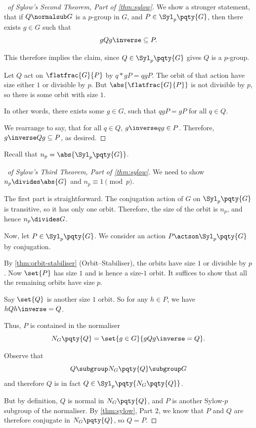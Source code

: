 \begin{proof}[\proofname\ of Sylow's Second Theorem, Part of \autoref{thm:sylow}]
    We show a stronger statement, that if \(Q \normalsub G\) is a \(p\)-group in \(G\), and \(P \in \Syl_p\pqty{G}\), then there exists \(g \in G\) such that
    \[
        g Q g\inverse \subseteq P.
    \]

    This therefore implies the claim, since \(Q \in \Syl_p\pqty{G}\) gives \(Q\) is a \(p\)-group.

    Let \(Q\) act on \(\flatfrac{G}{P}\) by \(q \ast gP = q gP\). The orbit of that action have size either \(1\) or divisible by \(p\). But \(\abs{\flatfrac{G}{P}}\) is not divisible by \(p\), so there is some orbit with size \(1\).

    In other words, there exists some \(g \in G\), such that \(qgP = gP\) for all \(q \in Q\).

    We rearrange to say, that for all \(q \in Q\), \(g \inverse q g \in P\). Therefore, \(g \inverse Q g \subseteq P\), as desired.
\end{proof}

Recall that \(n_p = \abs{\Syl_p\pqty{G}}\).

\begin{proof}[\proofname\ of Sylow's Third Theorem, Part of \autoref{thm:sylow}]
    We need to show \(n_p \divides \abs{G}\) and \(n_p \equiv 1 \pmod{p}\).

    The first part is straightforward. The conjugation action of \(G\) on \(\Syl_p\pqty{G}\) is transitive, so it has only one orbit. Therefore, the size of the orbit is \(n_p\), and hence \(n_p \divides G\).

    Now, let \(P \in \Syl_p\pqty{G}\). We consider an action \(P \actson \Syl_p\pqty{G}\) by conjugation.

    By \autoref{thm:orbit-stabiliser} (Orbit--Stabiliser), the orbits have size \(1\) or divisible by \(p\). Now \(\set{P}\) has size \(1\) and is hence a size-\(1\) orbit. It suffices to show that all the remaining orbits have size \(p\).

    Say \(\set{Q}\) is another size \(1\) orbit. So for any \(h \in P\), we have \(h Q h\inverse = Q\).

    Thus, \(P\) is contained in the normaliser
    \[
        N_G\pqty{Q} = \set{g \in G}{g Q g\inverse = Q}.
    \]

    Observe that
    \[
        Q \subgroup N_G\pqty{Q} \subgroup G
    \]
    and therefore \(Q\) is in fact \(Q \in \Syl_p \pqty{N_G\pqty{Q}}\).

    But by definition, \(Q\) is normal in \(N_G\pqty{Q}\), and \(P\) is another Sylow-\(p\) subgroup of the normaliser. By \autoref{thm:sylow}, Part 2, we know that \(P\) and \(Q\) are therefore conjugate in \(N_G\pqty{Q}\), so \(Q = P\).
\end{proof}

